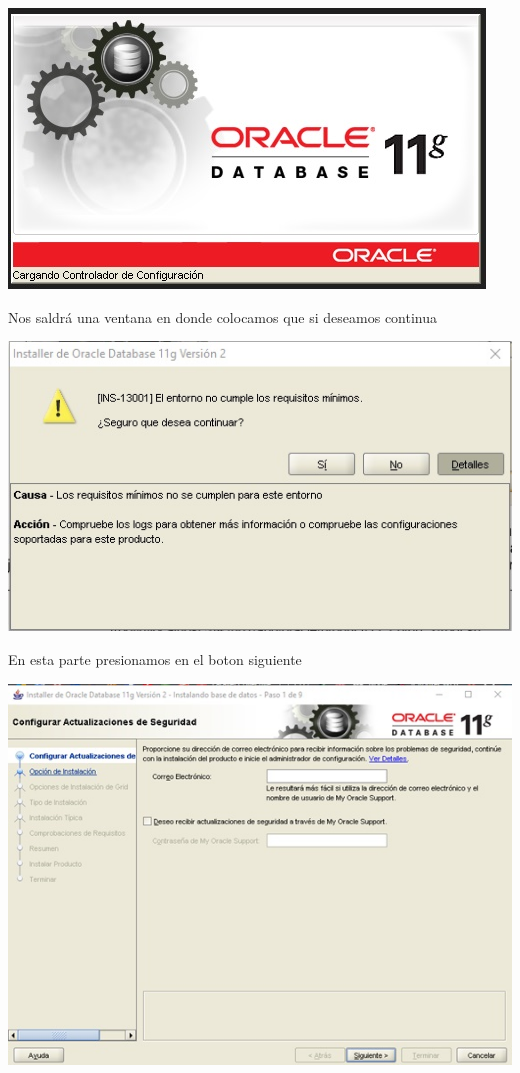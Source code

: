 \begin{flushleft}
\begin{center}
\includegraphics{images/image-03}\\
\end{center}
Nos saldrá una ventana en donde colocamos que si deseamos continua\\
\begin{center}
\includegraphics{images/image-04}\\
\end{center}
En esta parte presionamos en el boton siguiente\\
\begin{center}
\includegraphics{images/image-05}\\

\end{center}
\end{flushleft}
